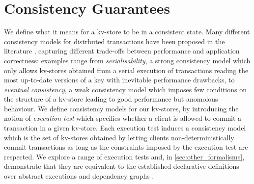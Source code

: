 \section{Consistency Guarantees}
\label{sec:cm}
We define what it means for a kv-store 
to be in a consistent state. Many different consistency models for
distrbuted transactions have 
been proposed in the literature
\cite{principle-eventual-consistency,rola,cops,redblue,PSI,clocksi},
capturing different trade-offs 
between  performance and application
correctness: examples range from  \emph{serialisability}, a strong
consistency model which only allows kv-stores 
obtained  from a serial execution of transactions reading the most
up-to-date versions of a key with inevitable performance
drawbacks, to  \emph{eventual consistency},  a weak consistency model
which imposes few conditions on the structure of a kv-store leading to
good performance but anomolous behaviour.
We define consistency models for our kv-stores,
by introducing the notion of 
\emph{execution test} which specifies whether a client is allowed to commit a transaction in a given 
kv-store. Each execution test induces a consistency model which is  the set of kv-stores obtained 
by letting clients non-deterministically commit transactions as long
as  the constraints 
imposed by the execution test are respected.
We explore a range of execution tests  and, in
\cref{sec:other_formalisms}, 
demonstrate that they are 
 equivalent to the established declarative definitions over abstract executions \cite{framework-concur} and dependency graphs \cite{adya}.


%
%
%





%
%

